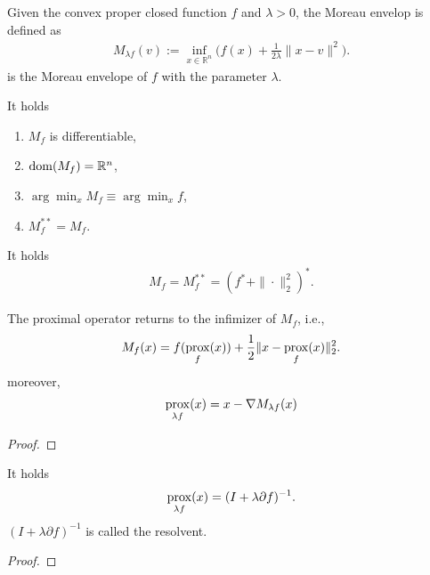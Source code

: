 \begin{definition}
	Given the convex proper closed function $f$ and $\lambda > 0$, the Moreau envelop is defined as 
	\begin{align*}
		M_{\lambda f}(v):= \inf_{x \in \mathbb{R}^n} \bigg( f (x) + \frac{1}{2 \lambda} \|x - v\|^2\bigg). 
	\end{align*}
	is the Moreau envelope of $f$ with the parameter $\lambda$. 
\end{definition}

\begin{lemma}
	It holds
	\begin{enumerate}
		\item $M_f$ is differentiable, 
		\item $\operatorname{dom} (M_f) = \mathbb{R}^n$, 
		\item $\arg\min_x M_f \equiv \arg\min _x f$,
		\item $M^{**}_f = M_f$.
	\end{enumerate}
\end{lemma}

\begin{corollary}
	It holds
	\begin{align*}
		M_f = M_f^{**} = (f^* + \|\cdot\|_2^2)^*. 
	\end{align*}
\end{corollary}

\begin{theorem}
	The proximal operator returns to the infimizer of $M_f$, i.e., 
	\begin{align*}
		M_f(x) = f(\operatorname*{prox}_f(x)) + \frac{1}{2} \| x - \operatorname*{prox}_f(x) \|_2^2. 
	\end{align*} 
	moreover, 
	\begin{align*}
		\operatorname*{prox}_{\lambda f}(x) = x - \nabla M_{ \lambda f} (x) 
	\end{align*}
\end{theorem}
\begin{proof}
	
\end{proof}

\begin{theorem}
	It holds
	\begin{align*}
		\operatorname*{prox}_{\lambda f}(x) = ( I + \lambda \partial f)^{-1}. 
	\end{align*}
	$(I + \lambda \partial f)^{-1}$ is called the resolvent. 
\end{theorem}
\begin{proof}
\end{proof}


